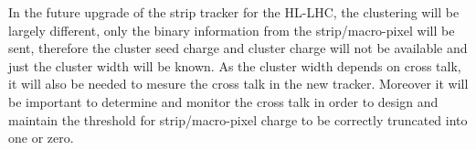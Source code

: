 




In the future upgrade of the strip tracker for the HL-LHC, the clustering will be largely different, only the binary information from the strip/macro-pixel will be sent, therefore the cluster seed charge and cluster charge will not be available and just the cluster width will be known. As the cluster width depends on cross talk, it will also be needed to mesure the cross talk in the new tracker. Moreover it will be important to determine and monitor the cross talk in order to design and maintain the threshold for strip/macro-pixel charge to be correctly truncated into one or zero.




